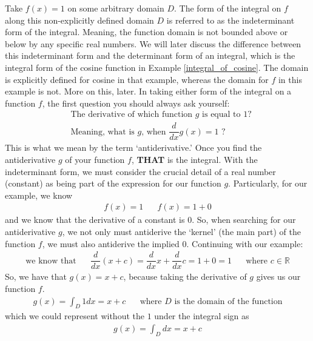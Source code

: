 \begin{example}
Take $f(x) = 1$ on some arbitrary domain $D$. The form of the integral on $f$ along this non-explicitly defined domain $D$ is referred to as the indeterminant form of the integral. Meaning, the function domain is not bounded above or below by any specific real numbers. We will later discuss the difference between this indeterminant form and the determinant form of an integral, which is the integral form of the cosine function in Example \ref{integral_of_cosine}. The domain is explicitly defined for cosine in that example, whereas the domain for $f$ in this example is not. More on this, later. In taking either form of the integral on a function $f$, the first question you should always ask yourself:
\begin{align*}
    &\text{The derivative of which function $g$ is equal to} \hspace{4pt} 1?\\[2ex]
    &\text{Meaning, what is $g$, when} \hspace{4pt} \dfrac{d}{dx}g(x) = 1 \hspace{4pt} \text{?}
\end{align*}
This is what we mean by the term `antiderivative.' Once you find the antiderivative $g$ of your function $f$, \textbf{THAT} is the integral. With the indeterminant form, we must consider the crucial detail of a real number (constant) as being part of the expression for our function $g$. Particularly, for our example, we know
\begin{align*}
f(x) = 1 \hspace{20pt} f(x) = 1 + 0
\end{align*}
and we know that the derivative of a constant is $0$. So, when searching for our antiderivative $g$, we not only must antiderive the `kernel' (the main part) of the function $f$, we must also antiderive the implied $0$. 
Continuing with our example:
\begin{align*}
    \text{we know that} \hspace{20pt} \dfrac{d}{dx} (x+c) = \dfrac{d}{dx} x + \dfrac{d}{dx} c = 1 + 0 = 1 \hspace{20pt} \text{where} \hspace{4pt} c \in \mathbb{R}
\end{align*}
So, we have that $g(x) = x+c$, because taking the derivative of $g$ gives us our function $f$. 
\begin{align*}
    g(x) = \int_{D} 1 dx = x + c \hspace{20pt} \text{where $D$ is the domain of the function}
\end{align*}
which we could represent without the $1$ under the integral sign as 
\begin{align*}
    g(x) = \int_{D} dx = x+c
\end{align*}
\end{example}

